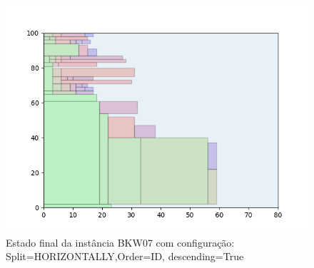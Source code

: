 \begin{figure}[H]
    \centering
    \caption[]{Estado final da instância BKW07 com configuração: Split=HORIZONTALLY,Order=ID, descending=True}
    \label{fig:bkw07-horizontally-id-true}
    \includegraphics[scale=0.5]{output/figures/bkw/bkw07/horizontally/id/true/00}
\end{figure}